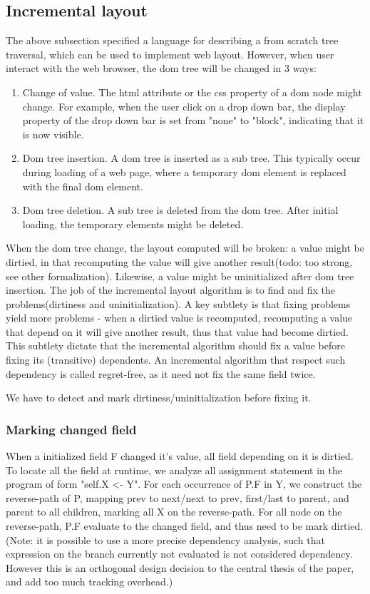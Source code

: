 \documentclass[format=acmsmall, review=false, screen=true]{acmart}
\begin{document}
\subsection{Incremental layout}
The above subsection specified a language for describing a from scratch tree traversal, which can be used to implement web layout. However, when user interact with the web browser, the dom tree will be changed in 3 ways:
\begin{enumerate}
	\item Change of value. The html attribute or the css property of a dom node might change. For example, when the user click on a drop down bar, the display property of the drop down bar is set from "none" to "block", indicating that it is now visible.
	\item Dom tree insertion. A dom tree is inserted as a sub tree. This typically occur during loading of a web page, where a temporary dom element is replaced with the final dom element.
	\item Dom tree deletion. A sub tree is deleted from the dom tree. After initial loading, the temporary elements might be deleted.
\end{enumerate}

When the dom tree change, the layout computed will be broken: a value might be dirtied, in that recomputing the value will give another result(todo: too strong, see other formalization). Likewise, a value might be uninitialized after dom tree insertion. The job of the incremental layout algorithm is to find and fix the problems(dirtiness and uninitialization). A key subtlety is that fixing problems yield more problems - when a dirtied value is recomputed, recomputing a value that depend on it will give another result, thus that value had become dirtied. This subtlety dictate that the incremental algorithm should fix a value before fixing its (transitive) dependents. An incremental algorithm that respect such dependency is called regret-free, as it need not fix the same field twice.

We have to detect and mark dirtiness/uninitialization before fixing it.

\subsubsection{Marking changed field}
When a initialized field F changed it's value, all field depending on it is dirtied. To locate all the field at runtime, we analyze all assignment statement in the program of form "self.X <- Y". For each occurrence of P.F in Y, we construct the reverse-path of P, mapping prev to next/next to prev, first/last to parent, and parent to all children, marking all X on the reverse-path. For all node on the reverse-path, P.F evaluate to the changed field, and thus need to be mark dirtied. (Note: it is possible to use a more precise dependency analysis, such that expression on the branch currently not evaluated is not considered dependency. However this is an orthogonal design decision to the central thesis of the paper, and add too much tracking overhead.)
\end{document}
